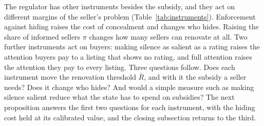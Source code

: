 \documentclass[10pt,letterpaper]{bp-template-concise}
\begin{document}
The regulator has other instruments besides the subsidy, and they act on different margins of the seller's problem (Table~\ref{tab:instruments}). Enforcement against hiding raises the cost of concealment and changes who hides. Raising the share of informed sellers $\pi$ changes how many sellers can renovate at all. Two further instruments act on buyers: making silence as salient as a rating raises the attention buyers pay to a listing that shows no rating, and full attention raises the attention they pay to every listing. Three questions follow. Does each instrument move the renovation threshold $\bar R$, and with it the subsidy a seller needs? Does it change who hides? And would a simple measure such as making silence salient reduce what the state has to spend on subsidies? The next proposition answers the first two questions for each instrument, with the hiding cost held at its calibrated value, and the closing subsection returns to the third.
\end{document}
